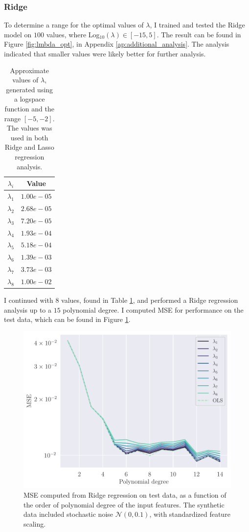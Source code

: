 \subsubsection{Ridge}\label{sssec:ridge_synthetic}
To determine a range for the optimal values of $\lambda$, I trained and tested the Ridge model on $100$ values, where Log$_{10}(\lambda) \in [-15, 5]$. The result can be found in Figure \ref{fig:lmbda_opt}, in Appendix \ref{ap:additional_analysis}. The analysis indicated that smaller values were likely better for further analysis. 
\begin{table}[h]
    \centering
    \begin{tabular}{cc}
        \hline
        $\lambda_{i}$ & Value \\
        \hline 
        $\lambda_{1}$ & $1.00e-05$ \\
        $\lambda_{2}$ & $2.68e-05$ \\
        $\lambda_{3}$ & $7.20e-05$ \\
        $\lambda_{4}$ & $1.93e-04$ \\
        $\lambda_{5}$ & $5.18e-04$ \\
        $\lambda_{6}$ & $1.39e-03$ \\
        $\lambda_{7}$ & $3.73e-03$ \\
        $\lambda_{8}$ & $1.00e-02$ \\
        \hline
    \end{tabular}
    \caption{Approximate values of $\lambda$, generated using a logspace function and the range $[-5, -2]$. The values was used in both Ridge and Lasso regression analysis.}
    \label{tab:lambdas}
\end{table}
I continued with $8$ values, found in Table \ref{tab:lambdas}, and performed a Ridge regression analysis up to a $15$ polynomial degree. I computed MSE for performance on the test data, which can be found in Figure \ref{fig:ridge_error}.
\begin{figure}[h]
    \centering
    \includegraphics[width=\linewidth]{project-1/latex/figures/ridge_error_scaled_N50.pdf}
    \caption{MSE computed from Ridge regression on test data, as a function of the order of polynomial degree of the input features. The synthetic data included stochastic noise $\mathcal{N}(0, 0.1)$, with standardized feature scaling.}
    \label{fig:ridge_error}
\end{figure}
